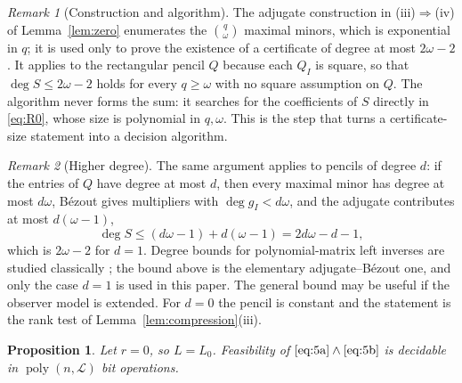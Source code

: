 \documentclass[journal]{IEEEtran}
\theoremstyle{plainn}
\newtheorem{prop}[thm]{Proposition}
\theoremstyle{remark}
\newtheorem{remark}{Remark}
\begin{document}
\begin{remark}[Construction and algorithm]\label{rem:construction}
The adjugate construction in (iii)$\Rightarrow$(iv) of Lemma~\ref{lem:zero}
enumerates the $\binom q\omega$ maximal minors, which is exponential in $q$; it
is used only to prove the existence of a certificate of degree at most
$2\omega-2$. It applies to the rectangular pencil $Q$ because each $Q_I$ is
square, so that $\deg S\le2\omega-2$ holds for every $q\ge\omega$ with no square
assumption on $Q$. The algorithm never forms the sum: it searches for the
coefficients of $S$ directly in \eqref{eq:R0}, whose size is polynomial in
$q,\omega$. This is the step that turns a certificate-size statement into a
decision algorithm.
\end{remark}

\begin{remark}[Higher degree]\label{rem:degree}
The same argument applies to pencils of degree $d$: if the entries of $Q$ have
degree at most $d$, then every maximal minor has degree at most $d\omega$,
B\'ezout gives multipliers with $\deg g_I<d\omega$, and the adjugate contributes
at most $d(\omega-1)$,
\begin{equation*}
\deg S\le(d\omega-1)+d(\omega-1)=2d\omega-d-1,
\end{equation*}
which is $2\omega-2$ for $d=1$. Degree bounds for polynomial-matrix left
inverses are studied classically \cite{fab90}; the bound above is the elementary
adjugate--B\'ezout one, and only the case $d=1$ is used in this paper. The
general bound may be useful if the observer model is extended. For $d=0$ the
pencil is constant and the statement is the rank test of
Lemma~\ref{lem:compression}(iii).
\end{remark}

\begin{prop}\label{prop:zero}
Let $r=0$, so $L=L_0$. Feasibility of $\eqref{eq:5a}\wedge\eqref{eq:5b}$ is
decidable in $\operatorname{poly}(n,\mathcal L)$ bit operations.
\end{prop}
\end{document}
